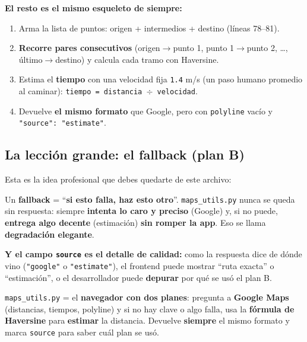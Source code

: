 \documentclass[11pt,a4paper]{article}
\begin{document}
\textbf{El resto es el mismo esqueleto de siempre:}
\begin{enumerate}
    \item Arma la lista de puntos: origen + intermedios + destino (líneas 78--81).
    \item \textbf{Recorre pares consecutivos} (origen$\rightarrow$punto 1, punto 1$\rightarrow$punto 2,
    \dots, último$\rightarrow$destino) y calcula cada tramo con Haversine.
    \item Estima el \textbf{tiempo} con una velocidad fija \texttt{1.4} m/s (un paso
    humano promedio al caminar): \texttt{tiempo = distancia $\div$ velocidad}.
    \item Devuelve \textbf{el mismo formato} que Google, pero con \texttt{polyline} vacío y
    \texttt{"source": "estimate"}.
\end{enumerate}

\subsection{La lección grande: el \textbf{fallback} (plan B)}

Esta es la idea profesional que debes quedarte de este archivo:

\begin{recuadro}
Un \textbf{fallback} = ``\textbf{si esto falla, haz esto otro}''. \texttt{maps\_utils.py} nunca
se queda sin respuesta: siempre \textbf{intenta lo caro y preciso} (Google) y, si no puede,
\textbf{entrega algo decente} (estimación) \textbf{sin romper la app}. Eso se llama
\textbf{degradación elegante}.
\end{recuadro}

\textbf{Y el campo \texttt{source} es el detalle de calidad:} como la respuesta dice de dónde
vino (\texttt{"google"} o \texttt{"estimate"}), el frontend puede mostrar ``ruta exacta'' o
``estimación'', o el desarrollador puede \textbf{depurar} por qué se usó el plan B.

\begin{recuadro}
\texttt{maps\_utils.py} = el \textbf{navegador con dos planes}: pregunta a \textbf{Google Maps}
(distancias, tiempos, polyline) y si no hay clave o algo falla, usa la \textbf{fórmula de
Haversine} para \textbf{estimar} la distancia. Devuelve \textbf{siempre} el mismo formato y
marca \texttt{source} para saber cuál plan se usó.
\end{recuadro}

\end{document}
